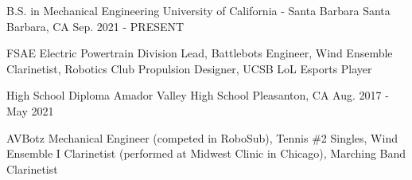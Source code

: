 


\begin{cventries}

\cventry
{B.S. in Mechanical Engineering} %
{University of California - Santa Barbara} %
{Santa Barbara, CA} %
{Sep. 2021 - PRESENT} %
{ %
\begin{cvitems}
\item {FSAE Electric Powertrain Division Lead, Battlebots Engineer, Wind Ensemble Clarinetist, Robotics Club Propulsion Designer, UCSB LoL Esports Player}
\end{cvitems}
}

\cventry
{High School Diploma} %
{Amador Valley High School} %
{Pleasanton, CA} %
{Aug. 2017 - May 2021} %
{ %
\begin{cvitems}
\item{AVBotz Mechanical Engineer (competed in RoboSub), Tennis \#2 Singles, Wind Ensemble I Clarinetist (performed at Midwest Clinic in Chicago), Marching Band Clarinetist}
\end{cvitems}
}




\end{cventries}
